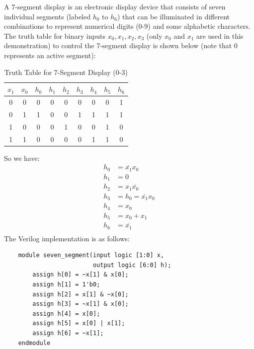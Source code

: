 \documentclass[11pt]{report}
\begin{document}
\begin{example}
    A 7-segment display is an electronic display device that consists of seven individual segments (labeled $h_0$ to $h_6$) that can be illuminated in different combinations to represent numerical digits (0-9) and some alphabetic characters. The truth table for binary inputs $x_0, x_1, x_2, x_3$ (only $x_0$ and $x_1$ are used in this demonstration) to control the 7-segment display is shown below (note that 0 represents an active segment):
    \begin{table}[h!]
        \centering
        \begin{tabular}{|c|c||c|c|c|c|c|c|c|}
            \hline
            $x_1$ & $x_0$ & $h_0$ & $h_1$ & $h_2$ & $h_3$ & $h_4$ & $h_5$ & $h_6$ \\
            \hline
            0 & 0 & 0 & 0 & 0 & 0 & 0 & 0 & 1 \\ %
            0 & 1 & 1 & 0 & 0 & 1 & 1 & 1 & 1 \\ %
            1 & 0 & 0 & 0 & 1 & 0 & 0 & 1 & 0 \\ %
            1 & 1 & 0 & 0 & 0 & 0 & 1 & 1 & 0 \\ %
        \hline
        \end{tabular}
        \caption{Truth Table for 7-Segment Display (0-3)}
        \label{tab:7_segment_display_truth_table}
    \end{table}
    So we have:
    \begin{align*}
        h_0 &= \overline{x_1}{x_0} \\
        h_1 &= 0 \\
        h_2 &= x_1\overline{x_0} \\
        h_3 &= h_0 = \overline{x_1}{x_0} \\
        h_4 &= x_0 \\
        h_5 &= x_0 + x_1 \\
        h_6 &= \overline{x_1} \\
    \end{align*}
    The Verilog implementation is as follows:
    \begin{verbatim}
    module seven_segment(input logic [1:0] x,
                         output logic [6:0] h);
        assign h[0] = ~x[1] & x[0];
        assign h[1] = 1'b0;
        assign h[2] = x[1] & ~x[0];
        assign h[3] = ~x[1] & x[0];
        assign h[4] = x[0];
        assign h[5] = x[0] | x[1];
        assign h[6] = ~x[1];
    endmodule
    \end{verbatim}


\end{example}
\end{document}
